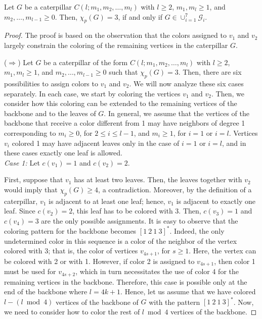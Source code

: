 \documentclass[10pt,a4paper]{amsart}
\begin{document}
\begin{theorem} \label{thm:caterpillar}
Let $G$ be a caterpillar $C(l;m_1,m_2,\ldots,m_l)$ with $l\geq 2$, $m_1,m_l \geq 1$, and $m_2,\ldots,m_{l-1}\geq 0$. Then, $\chi_p(G)=3$, if and only if $G \in \cup_{i=1}^{7}\mathcal{G}_i$. 

\end{theorem}

\begin{proof}
    The proof is based on the observation that the colors assigned to $v_1$ and $v_2$ largely constrain the coloring of the remaining vertices in the caterpillar $G$.

 ($\Rightarrow$) Let $G$ be a caterpillar of the form $C(l;m_1,m_2,\ldots,m_l)$ with $l\geq 2$, $m_1,m_l \geq 1$, and $m_2,\ldots,m_{l-1}\geq 0$ such that $\chi_p(G)=3$. Then, there are six possibilities to assign colors to $v_1$ and $v_2$. We will now analyze these six cases separately. In each case, we start by coloring the vertices $v_1$ and $v_2$. Then, we consider how this coloring can be extended to the remaining vertices of the backbone and to the leaves of $G$. In general, we assume that the vertices of the backbone that receive a color different from 1 may have neighbors of degree 1 corresponding to $m_i \geq 0$, for $2\leq i\leq l-1$, and $m_i \geq 1$, for $i=1$ or $i=l$. Vertices $v_i$ colored 1 may have adjacent leaves only in the case of $i=1$ or $i=l$, and in these cases exactly one leaf is allowed.
~~\\

\emph{Case 1:} Let $c(v_1)=1$ and  $c(v_2)=2$. 

First, suppose that $v_1$ has at least two leaves. Then, the leaves together with $v_2$ would imply that $\chi_p(G) \ge 4$, a contradiction. Moreover, by the definition of a caterpillar, $v_1$ is adjacent to at least one leaf; hence, $v_1$ is adjacent to exactly one leaf. Since $c(v_2)=2$, this leaf has to be colored with $3$. Then, $c(v_3)=1$ and $c(v_4)=3$ are the only possible assignments. It is easy to observe that the coloring pattern for the backbone becomes $[1\ 2\ 1\ 3]^{*}$. 
Indeed, the only undetermined color in this sequence is a color of the neighbor of the vertex colored with 3; that is, the color of vertices $v_{4s+1}$, for $s\geq 1$. Here, the vertex can be colored with 2 or with 1. However, if color 2 is assigned to $v_{4s+1}$, then color 1 must be used for $v_{4s+2}$, which in turn necessitates the use of color 4 for the remaining vertices in the backbone. Therefore, this case is possible only at the end of the backbone where $l=4k+1$.
Hence, let us assume that we have colored $l - (l \bmod 4)$ vertices of the backbone of $G$ with the pattern $[1\ 2\ 1\ 3]^{*}$. Now, we need to consider how to color the rest of $l \bmod 4$ vertices of the backbone. 


\end{proof}
\end{document}
